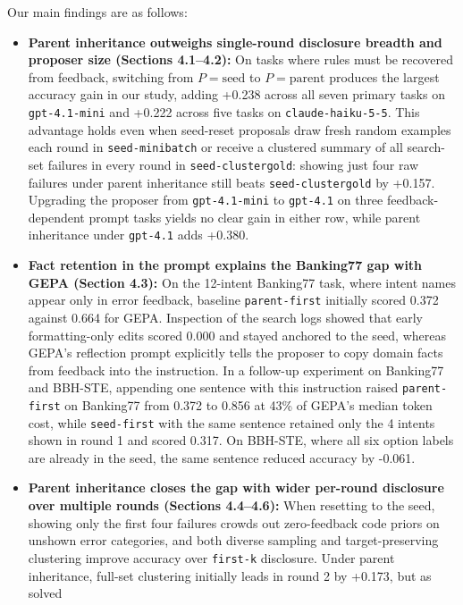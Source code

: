\documentclass[10pt]{article}
\providecommand{\tightlist}{%
  \setlength{\itemsep}{0pt}\setlength{\parskip}{0pt}}
\begin{document}
Our main findings are as follows:

\begin{itemize}
\tightlist
\item
  \textbf{Parent inheritance outweighs single-round disclosure breadth
  and proposer size (Sections 4.1--4.2):} On tasks where rules must be
  recovered from feedback, switching from \(P = \text{seed}\) to
  \(P = \text{parent}\) produces the largest accuracy gain in our study,
  adding +0.238 across all seven primary tasks on \texttt{gpt-4.1-mini}
  and +0.222 across five tasks on \texttt{claude-haiku-5-5}. This
  advantage holds even when seed-reset proposals draw fresh random
  examples each round in \texttt{seed-minibatch} or receive a clustered
  summary of all search-set failures in every round in
  \texttt{seed-clustergold}: showing just four raw failures under parent
  inheritance still beats \texttt{seed-clustergold} by +0.157. Upgrading
  the proposer from \texttt{gpt-4.1-mini} to \texttt{gpt-4.1} on three
  feedback-dependent prompt tasks yields no clear gain in either row,
  while parent inheritance under \texttt{gpt-4.1} adds +0.380.
\item
  \textbf{Fact retention in the prompt explains the Banking77 gap with
  GEPA (Section 4.3):} On the 12-intent Banking77 task, where intent
  names appear only in error feedback, baseline \texttt{parent-first}
  initially scored 0.372 against 0.664 for GEPA. Inspection of the
  search logs showed that early formatting-only edits scored 0.000 and
  stayed anchored to the seed, whereas GEPA's reflection prompt
  explicitly tells the proposer to copy domain facts from feedback into
  the instruction. In a follow-up experiment on Banking77 and BBH-STE,
  appending one sentence with this instruction raised
  \texttt{parent-first} on Banking77 from 0.372 to 0.856 at 43\% of
  GEPA's median token cost, while \texttt{seed-first} with the same
  sentence retained only the 4 intents shown in round 1 and scored
  0.317. On BBH-STE, where all six option labels are already in the
  seed, the same sentence reduced accuracy by -0.061.
\item
  \textbf{Parent inheritance closes the gap with wider per-round
  disclosure over multiple rounds (Sections 4.4--4.6):} When resetting
  to the seed, showing only the first four failures crowds out
  zero-feedback code priors on unshown error categories, and both
  diverse sampling and target-preserving clustering improve accuracy
  over \texttt{first-k} disclosure. Under parent inheritance, full-set
  clustering initially leads in round 2 by +0.173, but as solved

\end{itemize}
\end{document}
